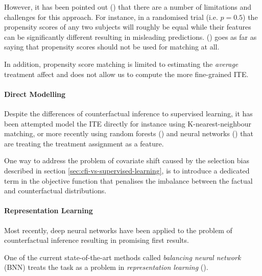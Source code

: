 However, it has been pointed out (\cite{propensity-score-matching-sucks}) that there are a number of limitations and challenges for this approach. For instance, in a randomised trial (i.e. $p =0.5$) the propensity scores of any two subjects will roughly be equal while their features can be significantly different resulting in misleading predictions. (\cite{propensity-score-matching-sucks}) goes as far as saying that propensity scores should not be used for matching at all. 

In addition, propensity score matching is limited to estimating the \emph{average }treatment affect and does not allow us to compute the more fine-grained ITE. 


%

\paragraph{Direct Modelling}
Despite the differences of counterfactual inference to supervised learning, it has been attempted model the ITE directly for instance using K-nearest-neighbour matching, or more recently using random forests (\cite{random-forests}) and neural networks (\cite{sontag-direct-modelling}) that are treating the treatment assignment as a feature.

One way to address the problem of covariate shift caused by the selection bias described in section \ref{sec:cfi-vs-supervised-learning}, is to introduce a dedicated term in the objective function that penalises the imbalance between the factual and counterfactual distributions.  


\paragraph{Representation Learning} \label{sec:representation-learning}
Most recently, deep neural networks have been applied to the problem of counterfactual inference resulting in promising first results. 

One of the current state-of-the-art methods called \emph{balancing neural network} (BNN) treats the task as a problem in \emph{representation learning} (\cite{sontag-paper}).

